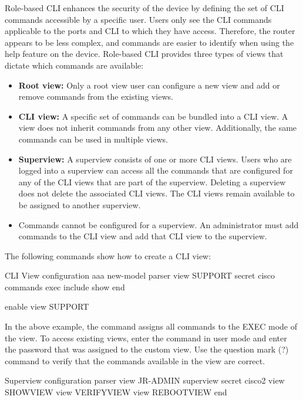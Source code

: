 Role-based CLI enhances the security of the device by defining the set of CLI commands accessible by a specific user. Users only see the CLI commands applicable to the ports and CLI to which they have access. Therefore, the router appears to be less complex, and commands are easier to identify when using the help feature on the device. Role-based CLI provides three types of views that dictate which commands are available:

\begin{itemize}
\item \textbf{Root view:} Only a root view user can configure a new view and add or remove commands from the existing views.
\item \textbf{CLI view:} A specific set of commands can be bundled into a CLI view.  A view does not inherit commands from any other view. Additionally, the same commands can be used in multiple views.
\item \textbf{Superview:} A superview consists of one or more CLI views. Users who are logged into a superview can access all the commands that are configured for any of the CLI views that are part of the superview. Deleting a superview does not delete the associated CLI views. The CLI views remain available to be assigned to another superview.
\item \note Commands cannot be configured for a superview. An administrator must add commands to the CLI view and add that CLI view to the superview.
\end{itemize}

The following commands show how to create a CLI view:

\begin{sexylisting}{CLI View configuration}
aaa new-model
parser view SUPPORT
  secret cisco
  commands exec include show
end

enable view SUPPORT
\end{sexylisting}

In the above example, the  command assigns all  commands to the EXEC mode of the view. To access existing views, enter the  command in user mode and enter the password that was assigned to the custom view. Use the question mark (?) command to verify that the commands available in the view are correct.

\begin{sexylisting}{Superview configuration}
parser view JR-ADMIN superview
  secret cisco2
  view SHOWVIEW
  view VERIFYVIEW
  view REBOOTVIEW
end
\end{sexylisting}


